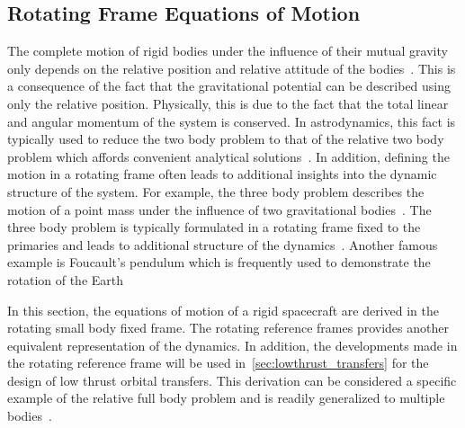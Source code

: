 \subsection{Rotating Frame Equations of Motion}\label{sec:asteroid_dumbbell_eoms}
The complete motion of rigid bodies under the influence of their mutual gravity only depends on the relative position and relative attitude of the bodies~\cite{lee2007a}.
This is a consequence of the fact that the gravitational potential can be described using only the relative position.
Physically, this is due to the fact that the total linear and angular momentum of the system is conserved.
In astrodynamics, this fact is typically used to reduce the two body problem to that of the relative two body problem which affords convenient analytical solutions~\cite{vallado2007,bate1971}.
In addition, defining the motion in a rotating frame often leads to additional insights into the dynamic structure of the system.
For example, the three body problem describes the motion of a point mass under the influence of two gravitational bodies~\cite{szebehely1967}.
The three body problem is typically formulated in a rotating frame fixed to the primaries and leads to additional structure of the dynamics~\cite{koon2011}.
Another famous example is Foucault's pendulum which is frequently used to demonstrate the rotation of the Earth

In this section, the equations of motion of a rigid spacecraft are derived in the rotating small body fixed frame.
The rotating reference frames provides another equivalent representation of the dynamics.
In addition, the developments made in the rotating reference frame will be used in~\cref{sec:lowthrust_transfers} for the design of low thrust orbital transfers.
This derivation can be considered a specific example of the relative full body problem and is readily generalized to multiple bodies~\cite{lee2007a}.

